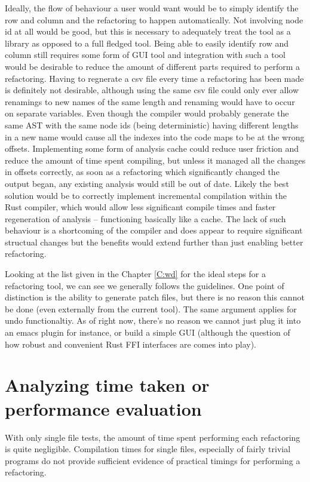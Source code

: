 Ideally, the flow of behaviour a user would want would be to simply identify the row and column and the refactoring to happen automatically. Not involving node id at all would be good, but this is necessary to adequately treat the tool as a library as opposed to a full fledged tool. Being able to easily identify row and column still requires some form of GUI tool and integration with such a tool would be desirable to reduce the amount of different parts required to perform a refactoring. Having to regnerate a csv file every time a refactoring has been made is definitely not desirable, although using the same csv file could only ever allow renamings to new names of the same length and renaming would have to occur on separate variables. Even though the compiler would probably generate the same AST with the same node ids (being deterministic) having different lengths in a new name would cause all the indexes into the code maps to be at the wrong offsets. Implementing some form of analysis cache could reduce user friction and reduce the amount of time spent compiling, but unless it managed all the changes in offsets correctly, as soon as a refactoring which significantly changed the output began, any existing analysis would still be out of date. Likely the best solution would be to correctly implement incremental compilation within the Rust compiler, which would allow less significant compile times and faster regeneration of analysis -- functioning basically like a cache. The lack of such behaviour is a shortcoming of the compiler and does appear to require significant structual changes but the benefits would extend further than just enabling better refactoring.

Looking at the list given in the Chapter \ref{C:wd} for the ideal steps for a refactoring tool, we can see we generally follows the guidelines. One point of distinction is the ability to generate patch files, but there is no reason this cannot be done (even externally from the current tool). The same argument applies for undo functionaltiy. As of right now, there's no reason we cannot just plug it into an emacs plugin for instance, or build a simple GUI (although the question of how robust and convenient Rust FFI interfaces are comes into play).


\section{Analyzing time taken or performance evaluation}
With only single file tests, the amount of time spent performing each refactoring is quite negligible. Compilation times for single files, especially of fairly trivial programs do not provide sufficient evidence of practical timings for performing a refactoring.

